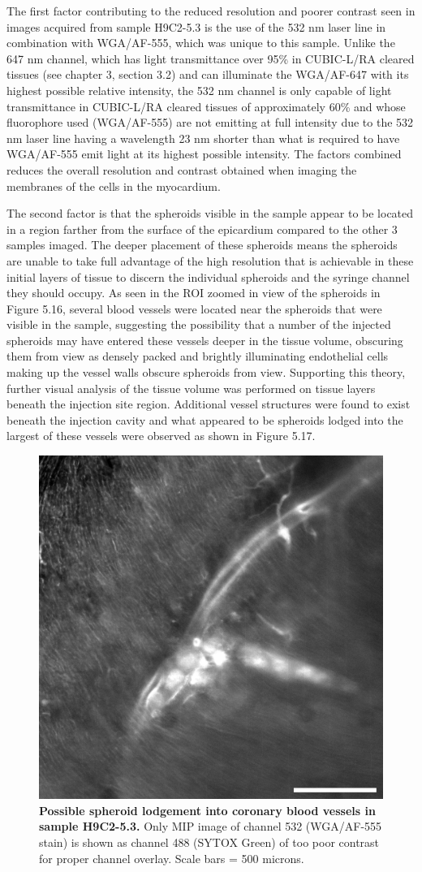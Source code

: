 The first factor contributing to the reduced resolution and poorer contrast seen in images acquired from sample H9C2-5.3 is the use of the 532 nm laser line in combination with WGA/AF-555, which was unique to this sample. Unlike the 647 nm channel, which has light transmittance over 95\% in CUBIC-L/RA cleared tissues (see chapter 3, section 3.2) and can illuminate the WGA/AF-647 with its highest possible relative intensity, the 532 nm channel is only capable of light transmittance in CUBIC-L/RA cleared tissues of approximately 60\% and whose fluorophore used (WGA/AF-555) are not emitting at full intensity due to the 532 nm laser line having a wavelength 23 nm shorter than what is required to have WGA/AF-555 emit light at its highest possible intensity. The factors combined reduces the overall resolution and contrast obtained when imaging the membranes of the cells in the myocardium. 	 

The second factor is that the spheroids visible in the sample appear to be located in a region farther from the surface of the epicardium compared to the other 3 samples imaged. The deeper placement of these spheroids means the spheroids are unable to take full advantage of the high resolution that is achievable in these initial layers of tissue to discern the individual spheroids and the syringe channel they should occupy. As seen in the ROI zoomed in view of the spheroids in Figure 5.16, several blood vessels were located near the spheroids that were visible in the sample, suggesting the possibility that a number of the injected spheroids may have entered these vessels deeper in the tissue volume, obscuring them from view as densely packed and brightly illuminating endothelial cells making up the vessel walls obscure spheroids from view. Supporting this theory, further visual analysis of the tissue volume was performed on tissue layers beneath the injection site region. Additional vessel structures were found to exist beneath the injection cavity and what appeared to be spheroids lodged into the largest of these vessels were observed as shown in Figure 5.17.

\begin{figure}[H]
\centering
\includegraphics[width=0.5\linewidth]{Images/Spheroids_In_Vessel.png}
\caption{\textbf{Possible spheroid lodgement into coronary blood vessels in sample H9C2-5.3.} Only MIP image of channel 532 (WGA/AF-555 stain) is shown as channel 488 (SYTOX Green) of too poor contrast for proper channel overlay. Scale bars = 500 microns.}
\label{fig:enter-label}
\end{figure}
\medskip

